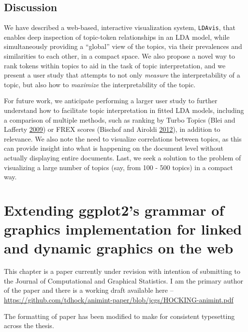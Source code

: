 \documentclass[12pt,]{isuthesis}
\begin{document}
\section{Discussion}\label{section:futurework}

We have described a web-based, interactive visualization system,
\texttt{LDAvis}, that enables deep inspection of topic-token
relationships in an LDA model, while simultaneously providing a
``global'' view of the topics, via their prevalences and similarities to
each other, in a compact space. We also propose a novel way to rank
tokens within topics to aid in the task of topic interpretation, and we
present a user study that attempts to not only \emph{measure} the
interpretability of a topic, but also how to \emph{maximize} the
interpretability of the topic.

For future work, we anticipate performing a larger user study to further
understand how to facilitate topic interpretation in fitted LDA models,
including a comparison of multiple methods, such as ranking by Turbo
Topics (Blei and Lafferty \protect\hyperlink{ref-Blei-2009}{2009}) or
FREX scores (Bischof and Airoldi \protect\hyperlink{ref-Bischof}{2012}),
in addition to relevance. We also note the need to visualize
correlations between topics, as this can provide insight into what is
happening on the document level without actually displaying entire
documents. Last, we seek a solution to the problem of visualizing a
large number of topics (say, from 100 - 500 topics) in a compact way.

\chapter{Extending ggplot2's grammar of graphics implementation for linked and dynamic graphics on the web} \label{sec:animint}

This chapter is a paper currently under revision with intention of
submitting to the Journal of Computational and Graphical Statistics. I
am the primary author of the paper and there is a working draft
available here --
\url{https://github.com/tdhock/animint-paper/blob/jcgs/HOCKING-animint.pdf}

The formatting of paper has been modified to make for consistent
typesetting across the thesis.

\end{document}
